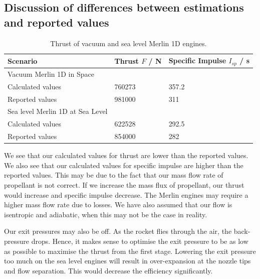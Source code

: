 \documentclass[11pt]{article}
\numberwithin{equation}{section}
\begin{document}
\subsection{Discussion of differences between estimations and reported values}
\begin{table}[H]
    \centering
    \begin{tabular}{@{}lll@{}}
        \toprule
        Scenario                         & {Thrust $F$ / \si{\newton}} & {Specific Impulse $I_{sp}$ / \si{\second}} \\
        \midrule
        Vacuum Merlin 1D in Space        &                             &                                            \\
        Calculated values                & 760273                      & 357.2                                      \\
        Reported values                  & 981000                      & 311                                        \\
        Sea level Merlin 1D at Sea Level &                             &                                            \\
        Calculated values                & 622528                      & 292.5                                      \\
        Reported values                  & 854000                      & 282                                        \\
        \bottomrule
    \end{tabular}
    \caption{Thrust of vacuum and sea level Merlin 1D engines.}
\end{table}
We see that our calculated values for thrust are lower than the reported values. We also see that our calculated values for specific impulse are higher than the reported values. This may be due to the fact that our mass flow rate of propellant is not correct. If we increase the mass flux of propellant, our thrust would increase and specific impulse decrease. The Merlin engines may require a higher mass flow rate due to losses. We have also assumed that our flow is isentropic and adiabatic, when this may not be the case in reality.

Our exit pressures may also be off. As the rocket flies through the air, the back-pressure drops. Hence, it makes sense to optimise the exit pressure to be as low as possible to maximise the thrust from the first stage. Lowering the exit pressure too much on the sea level engines will result in over-expansion at the nozzle tips and flow separation. This would decrease the efficiency significantly.
\end{document}
